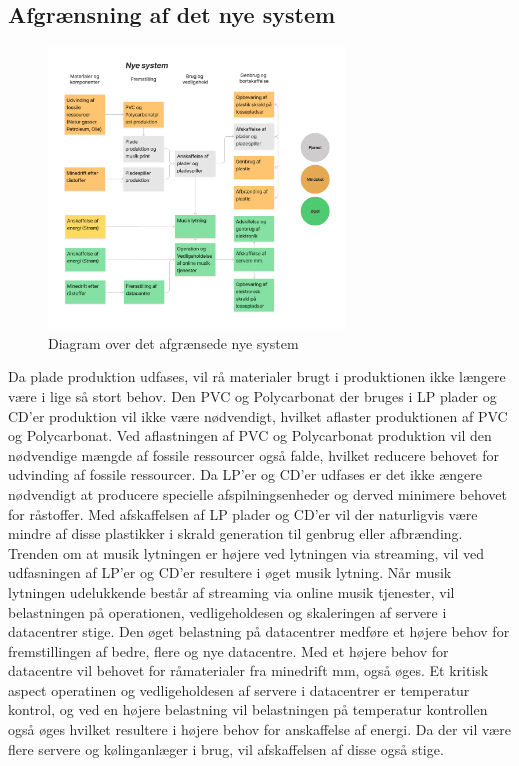 \subsection*{Afgrænsning af det nye system}

\begin{figure}[H]
    \centering
    \includegraphics[width=0.7\textwidth]{images/nytsystem.png}
    \caption{Diagram over det afgrænsede nye system}
    \label{fig:nyt}
\end{figure} 

Da plade produktion udfases, vil rå materialer brugt i produktionen ikke længere være i lige så stort behov. 
Den PVC og Polycarbonat der bruges i LP plader og CD'er produktion vil ikke være nødvendigt, hvilket aflaster produktionen af PVC og Polycarbonat.
Ved aflastningen af PVC og Polycarbonat produktion vil den nødvendige mængde af fossile ressourcer også falde, hvilket reducere behovet for udvinding af fossile ressourcer.
Da LP'er og CD'er udfases er det ikke ængere nødvendigt at producere specielle afspilningsenheder og derved minimere behovet for råstoffer.
Med afskaffelsen af LP plader og CD'er vil der naturligvis være mindre af disse plastikker i skrald generation til genbrug eller afbrænding.
Trenden om at musik lytningen er højere ved lytningen via streaming, vil ved udfasningen af LP'er og CD'er resultere i øget musik lytning.
Når musik lytningen udelukkende består af streaming via online musik tjenester, vil belastningen på operationen, vedligeholdesen og skaleringen af servere i datacentrer stige.
Den øget belastning på datacentrer medføre et højere behov for fremstillingen af bedre, flere og nye datacentre.
Med et højere behov for datacentre vil behovet for råmaterialer fra minedrift mm, også øges.
Et kritisk aspect operatinen og vedligeholdesen af servere i datacentrer er temperatur kontrol, og ved en højere belastning vil belastningen på temperatur kontrollen også øges hvilket resultere i højere behov for anskaffelse af energi.  
Da der vil være flere servere og kølinganlæger i brug, vil afskaffelsen af disse også stige.
